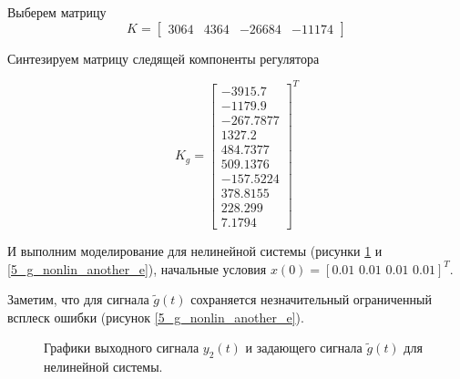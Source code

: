Выберем матрицу  $$K = \begin{bmatrix}
3064& 4364& -26684& -11174
\end{bmatrix}$$

Синтезируем матрицу следящей компоненты регулятора

\begin{equation}
	K_g = \begin{bmatrix}
		-3915.7\\	-1179.9\\	-267.7877\\	1327.2\\	484.7377\\	509.1376\\	-157.5224\\	378.8155\\	228.299\\	7.1794
	\end{bmatrix}^T
\end{equation}

И выполним моделирование для нелинейной системы (рисунки \ref{5_g_nonlin_another} и \ref{5_g_nonlin_another_e}), начальные условия $x(0) = 
[0.01 \,\, 0.01 \,\, 0.01 \,\, 0.01]^T$. 

Заметим, что для сигнала $\tilde{g}(t)$ сохраняется незначительный ограниченный всплеск ошибки (рисунок \ref{5_g_nonlin_another_e}).


\begin{figure}[!h]
	\caption{Графики выходного сигнала $y_2(t)$ и задающего сигнала $\tilde{g}(t)$ для нелинейной системы.}
	\label{5_g_nonlin_another}
\end{figure}

